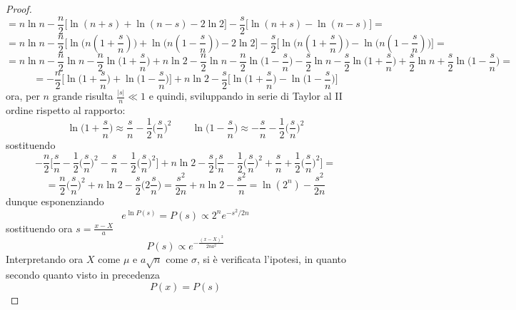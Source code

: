 \documentclass[10pt, oneside]{book}
\begin{document}
\begin{proof}
\[= n \ln n - \frac{n}{2}\bigg[\ln(n+s) + \ln(n-s) - 2 \ln 2\bigg] - \frac{s}{2} \bigg[\ln(n+s) - \ln(n-s)\bigg] = \]
\[= n \ln n - \frac{n}{2}\bigg[\ln\big(n(1 + \frac{s}{n})\big) + \ln\big(n(1 - \frac{s}{n})\big) - 2 \ln 2\bigg] - \frac{s}{2} \bigg[\ln\big(n(1 + \frac{s}{n})\big) - \ln\big(n(1-\frac{s}{n})\big)\bigg] = \]
\[= n \ln n - \frac{n}{2} \ln n - \frac{n}{2}\ln \bigg(1+ \frac{s}{n} \bigg) + n \ln 2 - \frac{n}{2} \ln n - \frac{n}{2} \ln \bigg(1- \frac{s}{n} \bigg) - \frac{s}{2} \ln n - \frac{s}{2} \ln \bigg( 1 + \frac{s}{n} \bigg) + \frac{s}{2} \ln n+ \frac{s}{2} \ln \bigg(1- \frac{s}{n} \bigg) =\]
\[= - \frac{n}{2} \bigg[\ln \bigg(1+ \frac{s}{n} \bigg) + \ln \bigg(1- \frac{s}{n} \bigg)\bigg] + n \ln 2 - \frac{s}{2} \bigg[\ln \bigg( 1 + \frac{s}{n} \bigg) - \ln \bigg(1- \frac{s}{n} \bigg)\bigg]\]
ora, per $n$ grande risulta $\displaystyle \frac{|s|}{n} \ll 1$ e quindi, sviluppando in serie di Taylor al II ordine rispetto al rapporto:
\[\ln \bigg( 1+\frac{s}{n} \bigg) \approx \frac{s}{n} - \frac{1}{2} \bigg(\frac{s}{n}\bigg)^{2} \qquad \ln \bigg( 1-\frac{s}{n} \bigg) \approx -\frac{s}{n} - \frac{1}{2} \bigg(\frac{s}{n}\bigg)^{2}\]
sostituendo
\[- \frac{n}{2} \bigg[\frac{s}{n} - \frac{1}{2} \bigg(\frac{s}{n}\bigg)^{2} - \frac{s}{n} - \frac{1}{2}\bigg(\frac{s}{n}\bigg)^{2}\bigg] + n \ln 2 - \frac{s}{2} \bigg[\frac{s}{n} - \frac{1}{2} \bigg(\frac{s}{n}\bigg)^{2} + \frac{s}{n} + \frac{1}{2} \bigg(\frac{s}{n}\bigg)^{2}\bigg] =\]
\[= \frac{n}{2} \bigg(\frac{s}{n}\bigg)^{2} + n \ln 2 - \frac{s}{2} \big(2 \frac{s}{n}\big) = \frac{s^2}{2n} + n \ln 2 - \frac{s^2}{n} = \ln(2^n) - \frac{s^2}{2n}\]
dunque esponenziando
\[e^{\ln P(s)} = P(s) \propto 2^n e^{-s^2/2n}\]
sostituendo ora $\displaystyle s = \frac{x - X}{a}$
\[P(s) \propto e^{- \displaystyle \frac{(x-X)^2}{2na^2}}\]
Interpretando ora $X$ come $\mu$ e $a\sqrt{n}$ come $\sigma$, si è verificata l'ipotesi, in quanto secondo quanto visto in precedenza
\[P(x) = P(s)\]
\end{proof}
\end{document}

